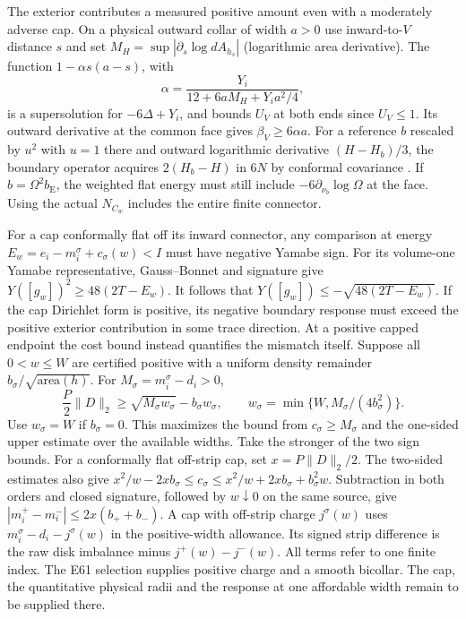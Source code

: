 \documentclass[11pt,letterpaper]{article}
\numberwithin{equation}{section}
\begin{document}
The exterior contributes a measured positive amount even with a
moderately adverse cap. On a physical outward collar of width
\(a>0\) use inward-to-\(V\) distance \(s\) and set
\(M_H=\sup|\partial_s\log dA_{h_s}|\) (logarithmic area derivative).
The function \(1-\alpha s(a-s)\), with
\[
 \alpha=\frac{Y_i}{12+6aM_H+Y_i a^2/4},
\]
is a supersolution for \(-6\Delta+Y_i\), and bounds \(U_V\)
at both ends since \(U_V\le1\). Its outward derivative at the
common face gives \(\beta_V\ge6\alpha a\).
For a reference \(b\) rescaled by \(u^2\) with \(u=1\) there
and outward logarithmic derivative \((H-H_b)/3\), the boundary
operator acquires \(2(H_b-H)\) in \(6N\) by conformal covariance
\cite[\S2]{LeeParker1987Yamabe}. If \(b=\Omega^2b_{\mathrm E}\),
the weighted flat energy must still include
\(-6\partial_{\nu_b}\log\Omega\) at the face.
Using the actual \(N_{C_w}\) includes the entire finite connector.

For a cap conformally flat off its inward connector, any comparison at energy
\(E_w=e_i-m_i^\sigma+c_\sigma(w)<I\) must have negative Yamabe
sign. For its volume-one Yamabe representative, Gauss--Bonnet
and signature give \(Y([g_w])^2\ge48(2T-E_w)\).
It follows that \(Y([g_w])\le-\sqrt{48(2T-E_w)}\).
If the cap Dirichlet form is positive, its negative boundary
response must exceed the positive exterior contribution in some
trace direction. At a positive capped endpoint the cost bound
instead quantifies the mismatch itself. Suppose all \(0<w\le W\)
are certified positive with a uniform density remainder
\(b_\sigma/\sqrt{\mathrm{area}(h)}\). For \(M_\sigma=m_i^\sigma-d_i>0\),
\[
  \frac P2\|D\|_2\ge
       \sqrt{M_\sigma w_\sigma}-b_\sigma w_\sigma,\qquad
  w_\sigma=\min\{W,M_\sigma/(4b_\sigma^2)\}.
\]
Use \(w_\sigma=W\) if \(b_\sigma=0\). This maximizes the bound
from \(c_\sigma\ge M_\sigma\) and the one-sided upper estimate
over the available widths. Take the stronger of the two sign bounds.
For a conformally flat off-strip cap, set \(x=P\|D\|_2/2\).
The two-sided estimates also give
\(x^2/w-2xb_\sigma\le c_\sigma\le
x^2/w+2xb_\sigma+b_\sigma^2w\). Subtraction in both orders and
closed signature, followed by \(w\downarrow0\) on the same source,
give \(|m_i^+-m_i^-|\le2x(b_++b_-)\). A cap with off-strip
charge \(j^\sigma(w)\) uses \(m_i^\sigma-d_i-j^\sigma(w)\) in
the positive-width allowance. Its signed strip difference is the
raw disk imbalance minus \(j^+(w)-j^-(w)\). All terms refer to one finite index.
The E61 selection supplies positive charge and a smooth bicollar.
The cap, the quantitative physical radii and the response at one
affordable width remain to be supplied there.
\end{document}
